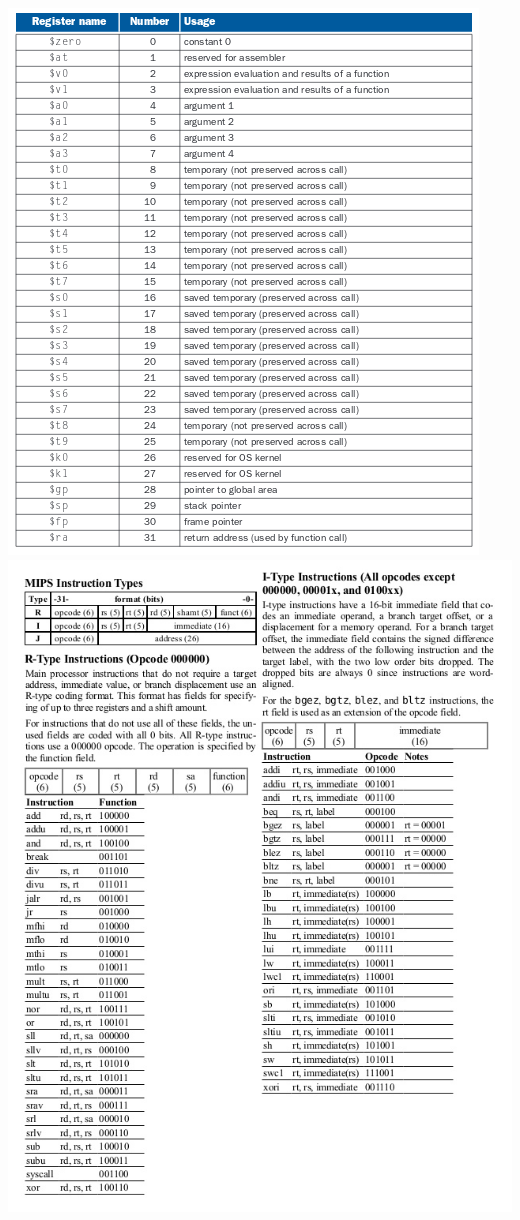 \documentclass[a4paper,12pt, oneside]{book}
\begin{document}
\includegraphics[scale=0.85]{img/reg.png}
\newpage
\includegraphics[scale=0.7]{img/r-i-code.jpg}
\end{document}
